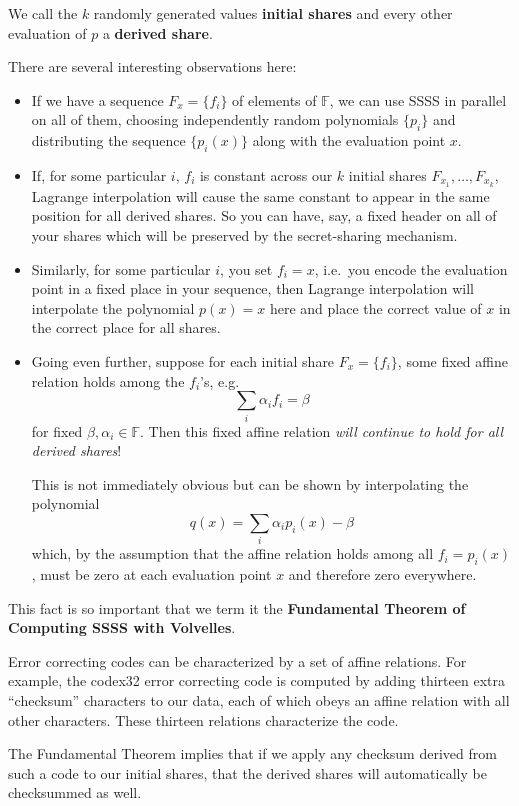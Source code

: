 \documentclass[letterpaper]{article}
\begin{document}
We call the $k$ randomly generated values \textbf{initial shares} and
every other evaluation of $p$ a \textbf{derived share}.

There are several interesting observations here:
\begin{itemize}
\item If we have a sequence $F_x = \{f_i\}$ of elements of $\mathbb{F}$, we can use
SSSS in parallel on all of them, choosing independently random polynomials
$\{p_i\}$ and distributing the sequence $\{p_i(x)\}$ along with the evaluation
point $x$.
\item If, for some particular $i$, $f_i$ is constant across our $k$ initial
shares $F_{x_1},\ldots,F_{x_k}$, Lagrange interpolation will cause the same
constant to appear in the same position for all derived shares. So you can
have, say, a fixed header on all of your shares which will be preserved by
the secret-sharing mechanism.
\item Similarly, for some particular $i$, you set $f_i=x$, i.e.~you encode the
evaluation point in a fixed place in your sequence, then Lagrange interpolation
will interpolate the polynomial $p(x) = x$ here and place the correct value
of $x$ in the correct place for all shares.
\item Going even further, suppose for each initial share $F_x=\{f_i\}$, some fixed
affine relation holds among the $f_i$'s, e.g.
\[ \sum_i \alpha_i f_i = \beta \]
for fixed $\beta,\alpha_i\in \mathbb{F}$. Then this fixed affine relation
\emph{will continue to hold for all derived shares}!

This is not immediately obvious but can be shown by interpolating the polynomial
    \[ q(x) = \sum_i \alpha_i p_i(x) - \beta \]
which, by the assumption that the affine relation holds among all $f_i = p_i(x)$,
must be zero at each evaluation point $x$ and therefore zero everywhere.
\end{itemize}

This fact is so important that we term it the \textbf{Fundamental Theorem of
Computing SSSS with Volvelles}.

Error correcting codes can be characterized by a set of affine relations.
For example, the codex32 error correcting code is computed by adding thirteen
extra ``checksum'' characters to our data, each of which obeys an affine
relation with all other characters. These thirteen relations characterize
the code.

The Fundamental Theorem implies that if we apply any checksum derived from
such a code to our initial shares, that the derived shares will automatically
be checksummed as well.
\end{document}
